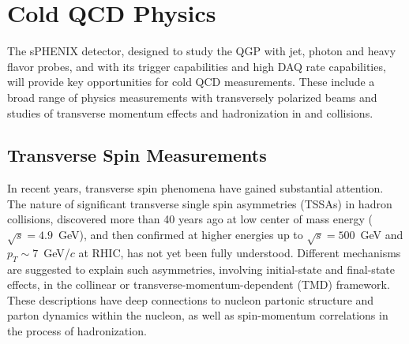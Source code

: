  





\section{Cold QCD Physics}
\label{sec:ColdQCD}

The sPHENIX detector, designed to study the QGP with jet, photon and
heavy flavor probes, and with its trigger capabilities and high DAQ
rate capabilities, will provide key opportunities for cold QCD
measurements. These include a broad range of physics measurements with
transversely polarized beams and studies of transverse momentum
effects and hadronization in \pp and \pA collisions.   


\subsection {Transverse Spin Measurements}

In recent years, transverse spin phenomena have gained substantial
attention. The nature of significant transverse single spin
asymmetries (TSSAs) in hadron collisions, discovered more than 40
years ago at low center of mass energy ($\sqrt{s}=4.9$~GeV), and then
confirmed at higher energies up to $\sqrt{s}=500$~GeV and $p_T \sim
7$~GeV/$c$ at RHIC, has not yet been fully understood. Different
mechanisms are suggested to explain such asymmetries, involving
initial-state and final-state effects, in the collinear or
transverse-momentum-dependent (TMD) framework. These descriptions have
deep connections to nucleon partonic structure and parton dynamics
within the nucleon, as well as spin-momentum correlations in the
process of hadronization. 

